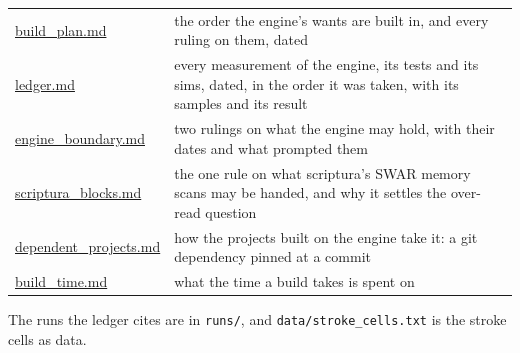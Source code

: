 {\begin{longtable}{>{\RaggedRight\arraybackslash}p{}>{\RaggedRight\arraybackslash}p{}}
\hyperref[chap:build-plan]{build\_\allowbreak{}plan.md} & the order the engine's wants are built in, and every ruling on them, dated \\
\hyperref[chap:ledger]{ledger.md} & every measurement of the engine, its tests and its sims, dated, in the order it was taken, with its samples and its result \\
\hyperref[chap:engine-boundary]{engine\_\allowbreak{}boundary.md} & two rulings on what the engine may hold, with their dates and what prompted them \\
\hyperref[chap:scriptura-blocks]{scriptura\_\allowbreak{}blocks.md} & the one rule on what scriptura's SWAR memory scans may be handed, and why it settles the over-read question \\
\hyperref[chap:dependent-projects]{dependent\_\allowbreak{}projects.md} & how the projects built on the engine take it: a git dependency pinned at a commit \\
\hyperref[chap:build-time]{build\_\allowbreak{}time.md} & what the time a build takes is spent on \\
\bottomrule
\end{longtable}
}

The runs the ledger cites are in \texttt{runs/\allowbreak{}}, and \texttt{data/\allowbreak{}stroke\_\allowbreak{}cells.\allowbreak{}txt} is the stroke cells as data.
